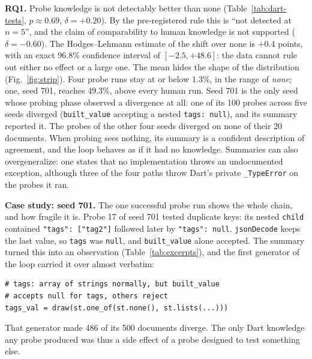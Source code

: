 \textbf{RQ1.} Probe knowledge is not detectably better than none
(Table~\ref{tab:dart-tests}, $p \approx 0.69$, $\delta = +0.20$). By the
pre-registered rule this is ``not detected at $n{=}5$'', and the claim of
comparability to human knowledge is not supported ($\delta = -0.60$). The
Hodges--Lehmann estimate of the shift over none is $+0.4$ points, with an
exact 96.8\% confidence interval of $[-2.5, +48.6]$: the data cannot rule
out either no effect or a large one.
The mean hides the shape of the distribution (Fig.~\ref{fig:strip}). Four probe runs stay at or
below 1.3\%, in the range of \emph{none}; one, seed 701, reaches 49.3\%,
above every human run. Seed 701 is the only seed whose probing phase
observed a divergence at all: one of its 100 probes across five seeds
diverged (\texttt{built\_value} accepting a nested \texttt{tags: null}), and
its summary reported it. The probes of the other four seeds diverged on
none of their 20 documents. When probing sees nothing, its summary is a
confident description of agreement, and the loop behaves as if it had no
knowledge. Summaries can also overgeneralize: one states that no
implementation throws an undocumented exception, although three of the four
paths throw Dart's private \texttt{\_TypeError} on the probes it ran.

\textbf{Case study: seed 701.} The one successful probe run shows the whole
chain, and how fragile it is. Probe 17 of seed 701 tested duplicate keys:
its nested \texttt{child} contained \texttt{"tags": ["tag2"]} followed later
by \texttt{"tags": null}. \texttt{jsonDecode} keeps the last value, so
\texttt{tags} was \texttt{null}, and \texttt{built\_value} alone accepted.
The summary turned this into an observation (Table~\ref{tab:excerpts}), and
the first generator of the loop carried it over almost verbatim:

\begin{center}
\begin{minipage}{0.95\columnwidth}
\scriptsize
\begin{verbatim}
# tags: array of strings normally, but built_value
# accepts null for tags, others reject
tags_val = draw(st.one_of(st.none(), st.lists(...)))
\end{verbatim}
\end{minipage}
\end{center}

\noindent That generator made 486 of its 500 documents diverge. The only
Dart knowledge any probe produced was thus a side effect of a probe
designed to test something else.

